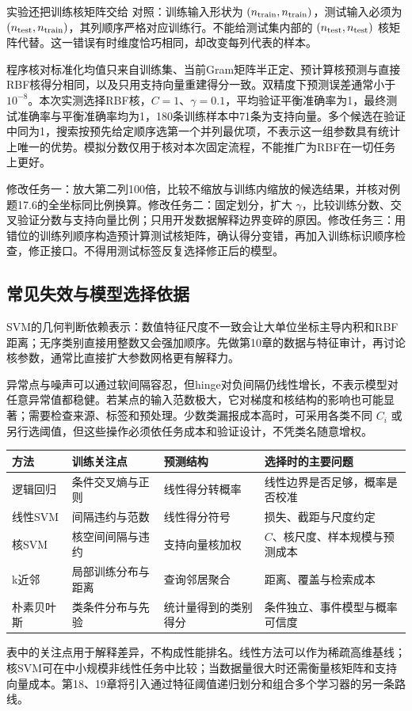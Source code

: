 \documentclass[UTF8,fontset=none,zihao=-4,a4paper]{ctexart}
\newcommand{\code}[1]{\texttt{\detokenize{#1}}}
\numberwithin{equation}{section}
\numberwithin{figure}{section}
\begin{document}
实验还把训练核矩阵交给 \code{SVC(kernel='precomputed')} 对照：训练输入形状为 $(n_{\rm train},n_{\rm train})$，测试输入必须为 $(n_{\rm test},n_{\rm train})$，其列顺序严格对应训练行。不能给测试集内部的 $(n_{\rm test},n_{\rm test})$ 核矩阵代替。这一错误有时维度恰巧相同，却改变每列代表的样本。

程序核对标准化均值只来自训练集、当前Gram矩阵半正定、预计算核预测与直接RBF核得分相同，以及只用支持向量重建得分一致。双精度下预测误差通常小于 $10^{-8}$。本次实测选择RBF核，$C=1$、$\gamma=0.1$，平均验证平衡准确率为1，最终测试准确率与平衡准确率均为1，180条训练样本中71条为支持向量。多个候选在验证中同为1，搜索按预先给定顺序选第一个并列最优项，不表示这一组参数具有统计上唯一的优势。模拟分数仅用于核对本次固定流程，不能推广为RBF在一切任务上更好。

修改任务一：放大第二列100倍，比较不缩放与训练内缩放的候选结果，并核对例题17.6的全坐标同比例换算。修改任务二：固定划分，扩大 $\gamma$，比较训练分数、交叉验证分数与支持向量比例；只用开发数据解释边界变碎的原因。修改任务三：用错位的训练列顺序构造预计算测试核矩阵，确认得分变错，再加入训练标识顺序检查，修正接口。不得用测试标签反复选择修正后的模型。

\subsection{常见失效与模型选择依据}
SVM的几何判断依赖表示：数值特征尺度不一致会让大单位坐标主导内积和RBF距离；无序类别直接用整数又会强加顺序。先做第10章的数据与特征审计，再讨论核参数，通常比直接扩大参数网格更有解释力。

异常点与噪声可以通过软间隔容忍，但hinge对负间隔仍线性增长，不表示模型对任意异常值都稳健。若某点的输入范数极大，它对梯度和核结构的影响也可能显著；需要检查来源、标签和预处理。少数类漏报成本高时，可采用各类不同 $C_i$ 或另行选阈值，但这些操作必须依任务成本和验证设计，不凭类名随意增权。

\begin{center}\small
\begin{tabularx}{\linewidth}{lYYY}\toprule
方法 & 训练关注点 & 预测结构 & 选择时的主要问题\\\midrule
逻辑回归 & 条件交叉熵与正则 & 线性得分转概率 & 线性边界是否足够，概率是否校准\\
线性SVM & 间隔违约与范数 & 线性得分符号 & 损失、截距与尺度约定\\
核SVM & 核空间间隔与违约 & 支持向量核加权 & $C$、核尺度、样本规模与预测成本\\
k近邻 & 局部训练分布与距离 & 查询邻居聚合 & 距离、覆盖与检索成本\\
朴素贝叶斯 & 类条件分布与先验 & 统计量得到的类别得分 & 条件独立、事件模型与概率可信度\\\bottomrule
\end{tabularx}\end{center}
表中的关注点用于解释差异，不构成性能排名。线性方法可以作为稀疏高维基线；核SVM可在中小规模非线性任务中比较；当数据量很大时还需衡量核矩阵和支持向量成本。第18、19章将引入通过特征阈值递归划分和组合多个学习器的另一条路线。
\end{document}
